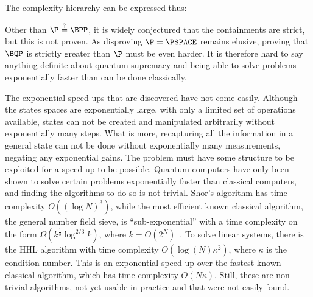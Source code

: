 The complexity hierarchy can be expressed thus:
\begin{center}

\end{center}
Other than $\P \stackrel{?}{=} \BPP$, it is widely conjectured that the containments are strict, but this is not proven.
As disproving $\P = \PSPACE$ remains elusive, proving that $\BQP$ is strictly greater than $\P$ must be even harder.
It is therefore hard to say anything definite about quantum supremacy and being able to solve problems exponentially faster than can be done classically.

The exponential speed-ups that are discovered have not come easily.
Although the states spaces are exponentially large, with only a limited set of operations available, states can not be created and manipulated arbitrarily without exponentially many steps.
What is more, recapturing all the information in a general state can not be done without exponentially many measurements, negating any exponential gains.
The problem must have some structure to be exploited for a speed-up to be possible.
Quantum computers have only been shown to solve certain problems exponentially faster than classical computers, and finding the algorithms to do so is not trivial.
Shor's algorithm has time complexity $O((\log N)^3)$, while the most efficient known classical algorithm, the general number field sieve, is \enquote{sub-exponential} with a time complexity on the form $\Omega(k^{\frac{1}{3}}\log^{2/3}k)$, where $k=O(2^N)$~\autocite{dervovic2018}.
To solve linear systems, there is the HHL algorithm with time complexity $O(\log(N)\kappa^2)$, where $\kappa$ is the condition number.
This is an exponential speed-up over the fastest known classical algorithm\footnotemark{}, which has time complexity $O(N \kappa)$.
Still, these are non-trivial algorithms, not yet usable in practice and that were not easily found.

